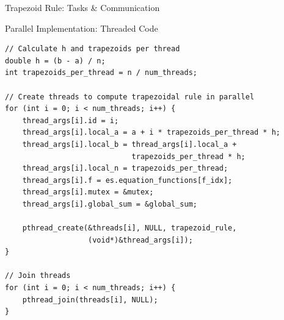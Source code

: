 \documentclass[t]{beamer}
\begin{document}
\begin{frame}{Trapezoid Rule: Tasks \& Communication}
\end{frame}

\begin{frame}[containsverbatim]{Parallel Implementation: Threaded Code}
\begin{verbatim}
// Calculate h and trapezoids per thread
double h = (b - a) / n;
int trapezoids_per_thread = n / num_threads;

// Create threads to compute trapezoidal rule in parallel
for (int i = 0; i < num_threads; i++) {
    thread_args[i].id = i;
    thread_args[i].local_a = a + i * trapezoids_per_thread * h;
    thread_args[i].local_b = thread_args[i].local_a +
                             trapezoids_per_thread * h;
    thread_args[i].local_n = trapezoids_per_thread;
    thread_args[i].f = es.equation_functions[f_idx];
    thread_args[i].mutex = &mutex;
    thread_args[i].global_sum = &global_sum;

    pthread_create(&threads[i], NULL, trapezoid_rule,
                   (void*)&thread_args[i]);
}

// Join threads
for (int i = 0; i < num_threads; i++) {
    pthread_join(threads[i], NULL);
}
\end{verbatim}
\end{frame}
\end{document}
